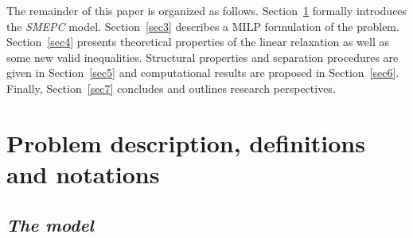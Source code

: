 \documentclass[11pt]{article}
\theoremstyle{plain}%
\theoremstyle{definition} \newtheorem{lem}{Lemma}[section]
\theoremstyle{definition} \newtheorem{claim}{Claim}[lem]
\theoremstyle{definition} \newtheorem{theorem}{Theorem}[section]
\theoremstyle{definition} \newtheorem{exo}{Exercice n$^\circ$}
\theoremstyle{definition} \newtheorem{quest}{}[exo]
\theoremstyle{definition} \newtheorem{sousquest}{}[quest]
\theoremstyle{remark}
\theoremstyle{definition}
\begin{document}
%
%


The remainder of this paper is organized as follows. Section~\ref{sec2} formally introduces the \emph{SMEPC} model. Section~\ref{sec3} describes a MILP formulation of the problem. Section~\ref{sec4} presents theoretical  properties of the linear relaxation as well as some new valid inequalities. Structural properties and
separation procedures are given in Section~\ref{sec5} and computational results are proposed in Section~\ref{sec6}. Finally, Section~\ref{sec7} concludes and outlines research perspectives.
\section{Problem description, definitions and notations}\label{sec2}

\subsection{ {\it The model}}
\end{document}
